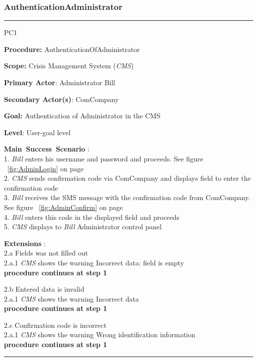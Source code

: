 \subsubsection{AuthenticationAdministrator}

\vspace{0.5cm}
\hrule
\begin{lyxlist}{PC1}
\small{
\item [\textbf{Procedure:}] AuthenticationOfAdministrator
\item [\textbf{Scope:}] Crisis Management System (\emph{CMS})
\item [\textbf{Primary Actor}:] Administrator Bill
\item [\textbf{Secondary Actor(s)}:] ComCompany
\item [\textbf{Goal:}] Authentication of Administrator in the CMS
\item [\textbf{Level}:] User-goal level
\item [\textbf{Main~Success~Scenario}]:\\
1. \emph{Bill} enters his username and password and proceeds. See figure
~\ref{fig:AdminLogin} on page~\pageref{fig:AdminLogin}\\
2. \emph{CMS} sends confirmation code via ComCompany and displays field to enter
the confirmation code \\
3. \emph{Bill} receives the SMS message with the confirmation code from
ComCompany. See figure ~\ref{fig:AdminConfirm} on
page ~\pageref{fig:AdminConfirm}\\
4. \emph{Bill} enters this code in the displayed field and proceeds\\
5. \emph{CMS} displays to \emph{Bill} Administrator control panel

\item [\textbf{Extensions}]:\\
2.a Fields was not filled out\\
\hspace*{0.5cm} 2.a.1 \emph{CMS} shows the warning Incorrect data: field is
empty\\
\hspace*{0.5cm} \textbf{procedure continues at step 1}

2.b Entered data is invalid\\
\hspace*{0.5cm} 2.a.1 \emph{CMS} shows the warning Incorrect data\\
\hspace*{0.5cm} \textbf{procedure continues at step 1}

2.c Confirmation code is incorrect\\
\hspace*{0.5cm} 2.a.1 \emph{CMS} shows the warning Wrong identification information\\
\hspace*{0.5cm} \textbf{procedure continues at step 1}

}
\end{lyxlist}
\hrule
\vspace{0.5cm}


